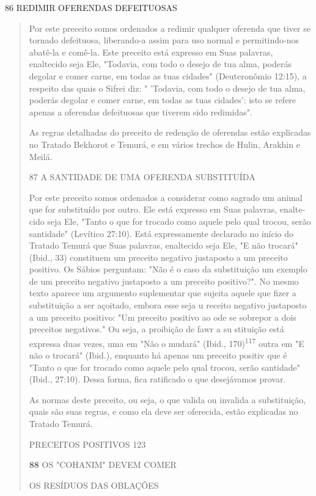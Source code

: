86 REDIMIR OFERENDAS DEFEITUOSAS

\begin{quote}
Por este preceito somos ordenados a redimir qualquer oferenda que tiver
se tornado defeituosa, liberando-a assim para uso normal e
permitindo-nos abatê-la e comê-la. Este preceito está expresso em Suas
palavras, enaltecido seja Ele, "Todavia, com todo o desejo de tua alma,
poderás degolar e comer carne, em todas as tuas cidades" (Deuteronômio
12:15), a respeito das quais o Sifrei diz: " 'Todavia, com todo o desejo
de tua alma, poderás degolar e co­mer carne, em todas as tuas cidades':
isto se refere apenas a oferendas defeituo­sas que tiverem sido
redimidas".

As regras detalhadas do preceito de redenção de oferendas estão
ex­plicadas no Tratado Bekhorot e Temurá, e em vários trechos de Hulin,
Arakhin e Meilá.

87 A SANTIDADE DE UMA OFERENDA SUBSTITUÍDA

Por este preceito somos ordenados a considerar como sagrado um animal
que for substituído por outro. Ele está expresso em Suas palavras,
enalte­cido seja Ele, "Tanto o que for trocado como aquele pelo qual
trocou, serão san­tidade" (Levítico 27:10). Está expressamente declarado
no início do Tratado Te­murá que Suas palavras, enaltecido seja Ele, "E
não trocará" (Ibid., 33) consti­tuem um preceito negativo justaposto a
um preceito positivo. Os Sábios pergun­tam: "Não é o caso da
substituição um exemplo de um preceito negativo justa­posto a um
preceito positivo?". No mesmo texto aparece um argumento suple­mentar
que sujeita aquele que fizer a substituição a ser açoitado, embora esse
seja u receito negativo justaposto a um preceito positivo: "Um preceito
posi­tivo ao ode se sobrepor a dois preceitos negativos." Ou seja, a
proibição de fawr a su stituição está expressa duas vezes, uma em "Não o
mudará" (Ibid., 170)\textsuperscript{117} outra em "E não o trocará"
(Ibid.), enquanto há apenas um preceito positiv que é "Tanto o que for
trocado como aquele pelo qual trocou, serão santidade" (Ibid., 27:10).
Dessa forma, fica ratificado o que desejávamos provar.

As normas deste preceito, ou seja, o que valida ou invalida a
substi­tuição, quais são suas regras, e como ela deve ser oferecida,
estão explicadas no Tratado Temurá.

PRECEITOS POSITIVOS 123

\textbf{88} OS "COHANIM" DEVEM COMER

OS RESÍDUOS DAS OBLAÇÕES


\end{quote}
